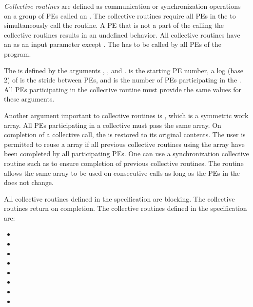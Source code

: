 \emph{Collective routines} are defined as communication or synchronization
operations on a group of \acp{PE} called an \activeset. The collective
routines require all \acp{PE} in the \activeset to simultaneously call the
routine.  A \ac{PE} that is not a part of the \activeset calling the collective
routines results in an undefined behavior.  All collective routines have an
\activeset as an input parameter except \barrierall. The \barrierall has to be 
called by all \acp{PE} of the \openshmem program. 

The \activeset is defined by the arguments , ,
and .   is the starting \ac{PE} number, a log (base
2) of  is the stride between \acp{PE}, and  is
the number of \acp{PE} participating in the \activeset.  All \acp{PE}
participating in the collective routine must provide the same values for these
arguments. 
 
Another argument important to collective routines is , which is a
symmetric work array.  All \acp{PE} participating in a collective must pass the
same  array.  On completion of a collective call, the  is
restored to its original contents.  The user is permitted to reuse a 
array if all previous collective routines using the  array have been
completed by all participating \acp{PE}.  One can use a synchronization
collective routine such as \barrier to ensure completion of previous collective
routines. The  routine allows the same  array to
be used on consecutive calls as long as the \acp{PE} in the \activeset does not change. 

All collective routines defined in the specification are blocking.  The
collective routines return on completion.  The collective routines defined in
the \openshmem specification are:

\begin{itemize}
\item[] \broadcast 
\item[] \barrier
\item[] \barrierall
\item[] \collect
\item[] \fcollect
\item[] \reduction
\item[] \alltoall
\item[] \alltoalls
\end{itemize} 

